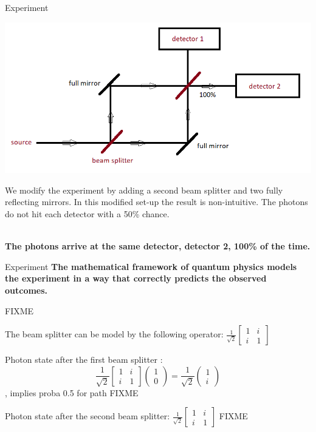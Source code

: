\documentclass[svgnames,smaller]{beamer}
\begin{document}
\begin{frame}[fragile]{Experiment}
  \begin{center}
      \includegraphics[height=.4\textheight]{exp2}
  \end{center}
  We modify the experiment by adding a second beam splitter and two fully reflecting mirrors.
  In this modified set-up the result is non-intuitive. The photons do not hit each detector with a 50\% chance. \\~\

  \textbf{The photons arrive at the same detector, detector 2, 100\% of the time.}

\end{frame}

\begin{frame}[fragile]{Experiment}
  \textbf{The mathematical framework of quantum physics models the experiment in a way that correctly predicts the observed outcomes.}

  FIXME
  
  The beam splitter can be model by the following operator:
  $\frac{1}{\sqrt{2}}\begin{bmatrix} 1 & i \\ i & 1 \end{bmatrix}$

  Photon state after the first beam splitter :
  $$\frac{1}{\sqrt{2}}\begin{bmatrix} 1 & i \\ i & 1 \end{bmatrix} \begin{pmatrix} 1 \\ 0 \end{pmatrix} =
  \frac{1}{\sqrt{2}} \begin{pmatrix} 1 \\ i \end{pmatrix}$$, implies proba 0.5 for path FIXME

  Photon state after the second beam splitter: $\frac{1}{\sqrt{2}}\begin{bmatrix} 1 & i \\ i & 1 \end{bmatrix}$ FIXME
\end{frame}
\end{document}
